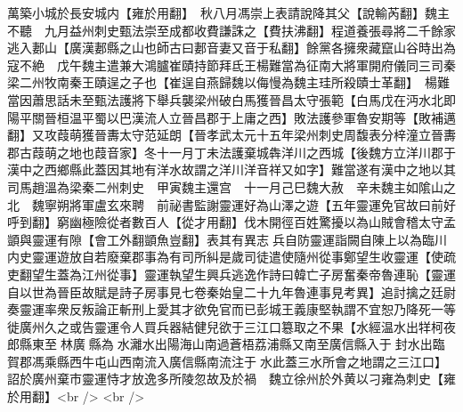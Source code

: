 萬築小城於長安城内【雍於用翻】　秋八月馮崇上表請說降其父【說輸芮翻】魏主不聽　九月益州刺史甄法崇至成都收費謙誅之【費扶沸翻】程道養張尋將二千餘家逃入郪山【廣漢郪縣之山也師古曰郪音妻又音于私翻】餘黨各擁衆藏竄山谷時出為寇不絶　戊午魏主遣兼大鴻臚崔賾持節拜氐王楊難當為征南大將軍開府儀同三司秦梁二州牧南秦王賾逞之子也【崔逞自燕歸魏以侮慢為魏主珪所殺賾士革翻】　楊難當因蕭思話未至甄法護將下舉兵襲梁州破白馬獲晉昌太守張範【白馬戊在沔水北即陽平關晉桓温平蜀以巴漢流人立晉昌郡于上庸之西】敗法護參軍魯安期等【敗補邁翻】又攻葭萌獲晉夀太守范延朗【晉孝武太元十五年梁州刺史周馥表分梓潼立晉夀郡古葭萌之地也葭音家】冬十一月丁未法護棄城犇洋川之西城【後魏方立洋川郡于漢中之西鄉縣此蓋因其地有洋水故謂之洋川洋音祥又如字】難當遂有漢中之地以其司馬趙溫為梁秦二州刺史　甲寅魏主還宫　十一月己巳魏大赦　辛未魏主如隂山之北　魏寧朔將軍盧玄來聘　前祕書監謝靈運好為山澤之遊【五年靈運免官故曰前好呼到翻】窮幽極險從者數百人【從才用翻】伐木開徑百姓驚擾以為山賊會稽太守孟顗與靈運有隙【會工外翻顗魚豈翻】表其有異志兵自防靈運詣闕自陳上以為臨川内史靈運遊放自若廢棄郡事為有司所糾是歲司徒遣使隨州從事鄭望生收靈運【使疏吏翻望生蓋為江州從事】靈運執望生興兵逃逸作詩曰韓亡子房奮秦帝魯連恥【靈運自以世為晉臣故賦是詩子房事見七卷秦始皇二十九年魯連事見考異】追討擒之廷尉奏靈運率衆反叛論正斬刑上愛其才欲免官而已彭城王義康堅執謂不宜恕乃降死一等徙廣州久之或告靈運令人買兵器結健兒欲于三江口簒取之不果【水經温水出䍧柯夜郎縣東至林廣縣為水灕水出陽海山南過蒼梧荔浦縣又南至廣信縣入于封水出臨賀郡馮乘縣西牛屯山西南流入廣信縣南流注于水此蓋三水所會之地謂之三江口】詔於廣州棄市靈運恃才放逸多所陵忽故及於禍　魏立徐州於外黄以刁雍為刺史【雍於用翻】<br />
<br />
